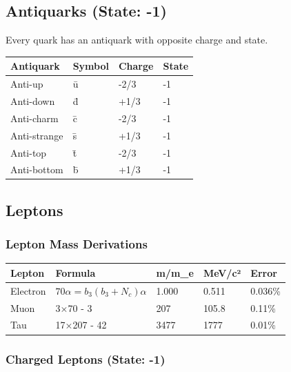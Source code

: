 \documentclass[
  11pt,
  letterpaper,
  twoside,
  openany]{book}
\makeatletter
\let\orig@subsection\subsection
\renewcommand{\subsection}{\needspace{6\baselineskip}\orig@subsection}
\let\orig@subsubsection\subsubsection
\renewcommand{\subsubsection}{\needspace{5\baselineskip}\orig@subsubsection}
\makeatother
\begin{document}
\subsection{Antiquarks (State: -1)}\label{antiquarks-state--1}

Every quark has an antiquark with opposite charge and state.

\begin{longtable}[]{@{}llll@{}}
\toprule\noalign{}
Antiquark & Symbol & Charge & State \\
\midrule\noalign{}
\endhead
\bottomrule\noalign{}
\endlastfoot
Anti-up & ū & -2/3 & -1 \\
Anti-down & d̄ & +1/3 & -1 \\
Anti-charm & c̄ & -2/3 & -1 \\
Anti-strange & s̄ & +1/3 & -1 \\
Anti-top & t̄ & -2/3 & -1 \\
Anti-bottom & b̄ & +1/3 & -1 \\
\end{longtable}

\subsection{Leptons}\label{leptons}

\subsubsection{Lepton Mass Derivations}\label{lepton-mass-derivations}

\begin{longtable}[]{@{}lllll@{}}
\toprule\noalign{}
Lepton & Formula & m/m\_e & MeV/c² & Error \\
\midrule\noalign{}
\endhead
\bottomrule\noalign{}
\endlastfoot
Electron & \(70\alpha = b_3(b_3+N_c)\alpha\) & 1.000 & 0.511 &
0.036\% \\
Muon & 3×70 - 3 & 207 & 105.8 & 0.11\% \\
Tau & 17×207 - 42 & 3477 & 1777 & 0.01\% \\
\end{longtable}

\subsubsection{Charged Leptons (State:
-1)}\label{charged-leptons-state--1}
\end{document}
